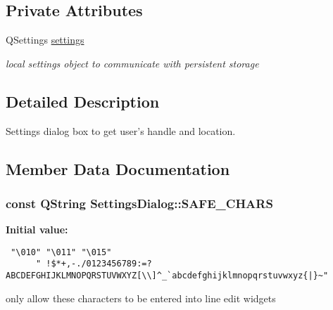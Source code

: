 \subsection*{Private Attributes}
\begin{CompactItemize}
\item 
\hypertarget{classSettingsDialog_22a1b1607d5bf39067836cd7efc06270}{
QSettings \hyperlink{classSettingsDialog_22a1b1607d5bf39067836cd7efc06270}{settings}}
\label{classSettingsDialog_22a1b1607d5bf39067836cd7efc06270}

\begin{CompactList}\small\item\em local settings object to communicate with persistent storage \item\end{CompactList}\end{CompactItemize}


\subsection{Detailed Description}
Settings dialog box to get user's handle and location. 

\subsection{Member Data Documentation}
\hypertarget{classSettingsDialog_6bc9a2b185317d57fa8297f67d8a2b24}{
\subsubsection[SAFE\_\-CHARS]{\setlength{\rightskip}{0pt plus 5cm}const QString {\bf SettingsDialog::SAFE\_\-CHARS}}}
\label{classSettingsDialog_6bc9a2b185317d57fa8297f67d8a2b24}


\textbf{Initial value:}

\begin{Code}\begin{verbatim} "\010" "\011" "\015"
      " !$*+,-./0123456789:=?ABCDEFGHIJKLMNOPQRSTUVWXYZ[\\]^_`abcdefghijklmnopqrstuvwxyz{|}~"
\end{verbatim}
\end{Code}
only allow these characters to be entered into line edit widgets 

